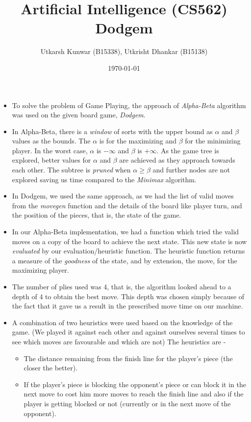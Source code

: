 \documentclass[a4paper, 12pt]{article}
\title{\Large{\textbf{Artificial Intelligence (CS562)}}\\\vspace{0.5em}Dodgem\\
}
\author{\normalsize{Utkarsh Kunwar (B15338), Utkrisht Dhankar (B15138)}}
\date{\normalsize{\today}}
\begin{document}
\maketitle

\normalsize

\begin{itemize}
	\item To solve the problem of Game Playing, the approach of \textit{Alpha-Beta} algorithm was used on the given board game, \textit{Dodgem}.
	\item In Alpha-Beta, there is a \textit{window} of sorts with the upper bound as $\alpha$ and $\beta$ values as the bounds. The $\alpha$ is for the maximizing and $\beta$ for the minimizing player. In the worst case, $\alpha$ is $-\infty$ and $\beta$ is $+\infty$. As the game tree is explored, better values for $\alpha$ and $\beta$ are achieved as they approach towards each other. The subtree is \textit{pruned} when $\alpha \geq \beta$ and further nodes are not explored saving us time compared to the \textit{Minimax} algorithm.
	\item In Dodgem, we used the same approach, as we had the list of valid moves from the \textit{movegen} function and the details of the board like player turn, and the position of the pieces, that is, the state of the game.
	\item In our Alpha-Beta implementation, we had a function which tried the valid moves on a copy of the board to achieve the next state. This new state is now \textit{evaluated} by our evaluation/heuristic function. The heuristic function returns a measure of the \textit{goodness} of the state, and by extension, the move, for the maximizing player.
	\item The number of plies used was 4, that is, the algorithm looked ahead to a depth of 4 to obtain the best move. This depth was chosen simply because of the fact that it gave us a result in the prescribed move time on our machine.
	\item A combination of two heuristics were used based on the knowledge of the game. (We played it against each other and against ourselves several times to see which moves are favourable and which are not) The heuristics are -
	\begin{itemize}
		\item The distance remaining from the finish line for the player's piece (the closer the better).
		\item If the player's piece is blocking the opponent's piece or can block it in the next move to cost him more moves to reach the finish line and also if the player is getting blocked or not (currently or in the next move of the opponent).
	\end{itemize}

\end{itemize}
\end{document}
